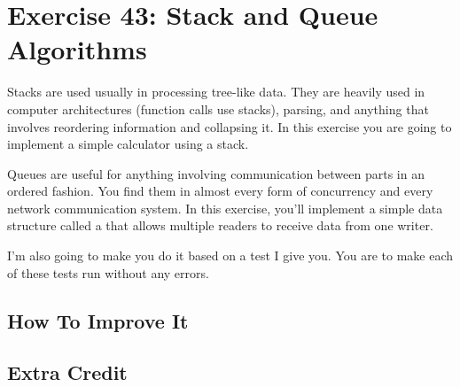 \chapter{Exercise 43: Stack and Queue Algorithms}

Stacks are used usually in processing tree-like data.  They are heavily used
in computer architectures (function calls use stacks), parsing, and anything
that involves reordering information and collapsing it.  In this exercise
you are going to implement a simple calculator using a stack.

Queues are useful for anything involving communication between parts in an
ordered fashion.  You find them in almost every form of concurrency and
every network communication system.  In this exercise, you'll implement
a simple data structure called a  that allows multiple
readers to receive data from one writer.

I'm also going to make you do it based on a test I give you.  You are to make
each of these tests run without any  errors.


\section{How To Improve It}


\section{Extra Credit}




